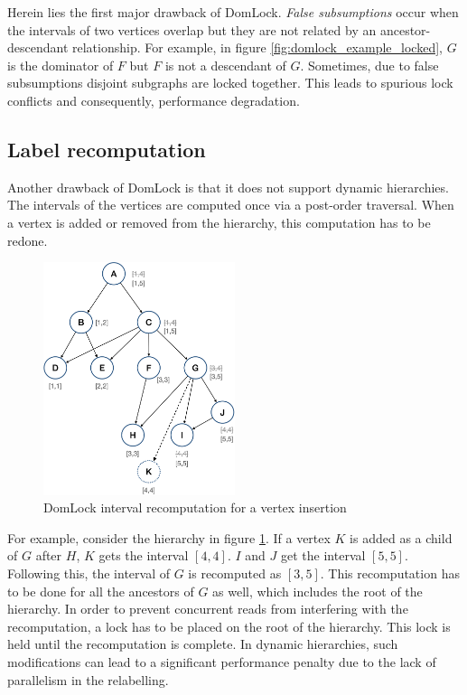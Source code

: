 Herein lies the first major drawback of DomLock. \emph{False subsumptions} occur when the intervals of two vertices overlap but they are not related by an ancestor-descendant relationship. For example, in figure \ref{fig:domlock_example_locked}, $G$ is the dominator of $F$ but $F$ is not a descendant of $G$. Sometimes, due to false subsumptions disjoint subgraphs are locked together. This leads to spurious lock conflicts and consequently, performance degradation. 

\subsection{Label recomputation}
Another drawback of DomLock is that it does not support dynamic hierarchies. The intervals of the vertices are computed once via a post-order traversal. When a vertex is added or removed from the hierarchy, this computation has to be redone. 

\begin{figure}[h]
    \centering
    \captionsetup{justification=centering}
    \includegraphics[width=0.5\textwidth]{figures/domlock_example_with_SM.png}
    \caption{DomLock interval recomputation for a vertex insertion}
    \label{fig:domlock_example_SM}
\end{figure}

For example, consider the hierarchy in figure \ref{fig:domlock_example_SM}. If a vertex $K$ is added as a child of $G$ after $H$, $K$ gets the interval $[4,4]$. $I$ and $J$ get the interval $[5,5]$. Following this, the interval of $G$ is recomputed as $[3,5]$. This recomputation has to be done for all the ancestors of $G$ as well, which includes the root of the hierarchy. In order to prevent concurrent reads from interfering with the recomputation, a lock has to be placed on the root of the hierarchy. This lock is held until the recomputation is complete. 
In dynamic hierarchies, such modifications can lead to a significant performance penalty due to the lack of parallelism in the relabelling. 

